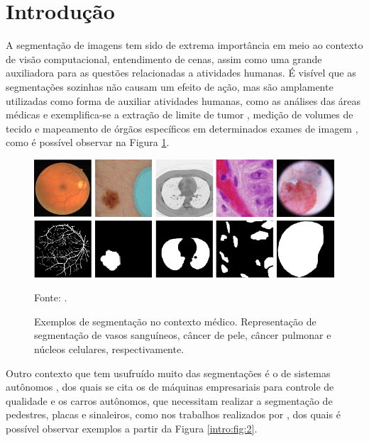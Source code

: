\newpage
\clearpage
{}
\section{Introdução}
\label{intro:intro}

A segmentação de imagens tem sido de extrema importância em meio ao contexto de visão computacional, entendimento de cenas, assim como uma grande auxiliadora para as questões relacionadas a atividades humanas. É visível que as segmentações sozinhas não causam um efeito de ação, mas são amplamente utilizadas como forma de auxiliar atividades humanas, como as análises das áreas médicas \cite{Lai2015, Withey2008} e exemplifica-se a extração de limite de tumor \cite{Malkanthi2017}, medição de volumes de tecido e mapeamento de órgãos específicos em determinados exames de imagem \cite{Gibson2018, Schoppe2020}, como é possível observar na Figura \ref{intro:fig:1}.

\begin{figure}[H]
    \centering
    \caption{Exemplos de segmentação no contexto médico. Representação de segmentação de vasos sanguíneos, câncer de pele, câncer pulmonar e núcleos celulares, respectivamente.}
    \includegraphics[width=1\linewidth]{recursos/imagens/introduction/medical-image-segmentation.png}
    \label{intro:fig:1}

    Fonte: \cite{Asadi-Aghbolaghi2020}.
\end{figure}

Outro contexto que tem usufruído muito das segmentações é o de sistemas autônomos \cite{Kaymak2019, Liu2020, Pan2020, Teichmann2018}, dos quais se cita os de máquinas empresariais para controle de qualidade e os carros autônomos, que necessitam realizar a segmentação de pedestres, placas e sinaleiros, como nos trabalhos realizados por \cite{Lee2018, Fleyeh2004, Pan2020}, dos quais é possível observar exemplos a partir da Figura \ref{intro:fig:2}.

